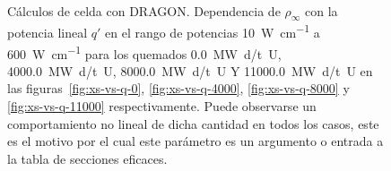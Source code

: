 \documentclass[11pt]{article}
\begin{document}
\begin{figure}[ht!]
   \centering
    \\[10pt]
   \caption{ Cálculos de celda con DRAGON. Dependencia de $\rho_{\infty}$ con la potencia lineal $q\prime$ en el rango de potencias \num{10}~\si{\watt.\centi\meter^{-1}} a  \num{600}~\si{\watt.\centi\meter^{-1}} para los quemados \num{0.0}~\si{\mega\watt\day / \tonne U}, \num{4000.0}~\si{\mega\watt\day / \tonne U}, \num{8000.0}~\si{\mega\watt\day / \tonne U} Y \num{11000.0}~\si{\mega\watt\day / \tonne U} en las figuras~\ref{fig:xs-vs-q-0}, \ref{fig:xs-vs-q-4000}, \ref{fig:xs-vs-q-8000} y \ref{fig:xs-vs-q-11000} respectivamente. Puede observarse un comportamiento no lineal de dicha cantidad en todos los casos, este es el motivo por el cual este parámetro es un argumento o entrada a la tabla de secciones eficaces. }

\end{figure}
\end{document}
